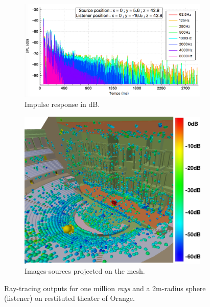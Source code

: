 \documentclass[AMA,STIX1COL]{WileyNJD-v2}
\begin{document}
\begin{figure}[t]
\centering
	\begin{subfigure}{0.6\textwidth}
		\includegraphics[width=\linewidth]{rirTheatreAvecDecor}
		\caption{Impulse response in dB.}
		\label{rirTheatre20}
	\end{subfigure}
	\begin{subfigure}{0.37\textwidth}
\includegraphics[width=\linewidth]{SI60dB}
		\caption{Images-sources projected on the mesh.}
		\label{isTheatre20}
	\end{subfigure}
	\caption{Ray-tracing outputs for one million \textit{rays} and a 2m-radius sphere (listener) on restituted theater of Orange.}
	\label{SI60dB}
\end{figure}
\end{document}
